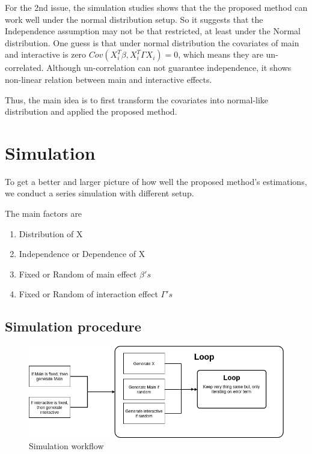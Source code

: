 \documentclass[]{article}
\providecommand{\tightlist}{%
  \setlength{\itemsep}{0pt}\setlength{\parskip}{0pt}}
\begin{document}
For the 2nd issue, the simulation studies shows that the the proposed
method can work well under the normal distribution setup. So it suggests
that the Independence assumption may not be that restricted, at least
under the Normal distribution. One guess is that under normal
distribution the covariates of main and interactive is zero
\(Cov(X_i^T\beta, X_i^T\Gamma X_i) = 0\), which means they are
un-correlated. Although un-correlation can not guarantee independence,
it shows non-linear relation between main and interactive effects.

Thus, the main idea is to first transform the covariates into
normal-like distribution and applied the proposed method.

\section{Simulation}\label{simulation}

To get a better and larger picture of how well the proposed method's
estimations, we conduct a series simulation with different setup.

The main factors are

\begin{enumerate}
\def\labelenumi{\arabic{enumi}.}
\tightlist
\item
  Distribution of X\\
\item
  Independence or Dependence of X\\
\item
  Fixed or Random of main effect \(\beta's\)\\
\item
  Fixed or Random of interaction effect \(\Gamma's\)
\end{enumerate}

\subsection{Simulation procedure}\label{simulation-procedure}

\begin{figure}
\centering
\includegraphics{./simulation_workflow.png}
\caption{Simulation workflow}
\end{figure}
\end{document}
